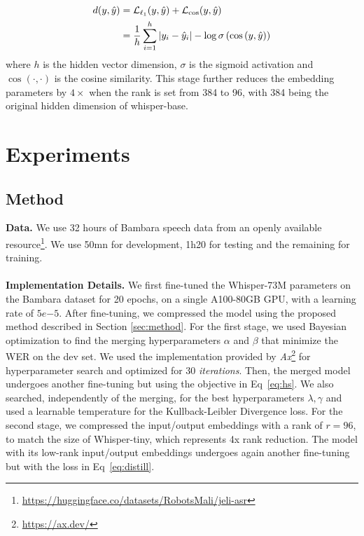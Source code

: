 \documentclass{article}
\newcommand{\myparagraph}[1]{\noindent\textbf{#1}}
\begin{document}
{\begin{align*}
    \label{eq:distance}
    d(y, \hat{y}) &= \mathcal{L}_{\ell_{1}}(y, \hat{y}) + \mathcal{L}_{\cos}(y, \hat{y}) \\
    & = \frac{1}{h} \sum_{i=1}^h |y_i - \hat{y}_i| - \log \sigma \left( \cos \left( y, \hat{y} \right) \right) \notag
\end{align*}
where $h$ is the hidden vector dimension, $\sigma$ is the
sigmoid activation and $\cos(\cdot, \cdot)$ is the cosine similarity.
This stage further reduces the embedding parameters by $4\times$ when the rank is set from 384 to 96, with 384 being the original hidden dimension of whisper-base.

\section{Experiments}
\subsection{Method}
\myparagraph{Data.} We use 32 hours of Bambara speech data from an openly available resource\footnote{\url{https://huggingface.co/datasets/RobotsMali/jeli-asr}}. We use 50mn for development, 1h20 for testing and the remaining for training.
\\
\\
\myparagraph{Implementation Details.} We first fine-tuned the Whisper-73M parameters on the Bambara dataset for 20 epochs, on a single A100-80GB GPU, with a learning rate of $5e{-5}$. After fine-tuning, we compressed the model using the proposed method described in Section \ref{sec:method}. For the first stage, we used Bayesian optimization to find the merging hyperparameters $\alpha$ and $\beta$ that minimize the WER on the dev set. We used the implementation provided by \emph{Ax}\footnote{\url{https://ax.dev/}} for hyperparameter search and optimized for 30 \textit{iterations}. Then, the merged model undergoes another fine-tuning but using the objective in Eq~\ref{eq:hs}. We also searched, independently of the merging, for the best hyperparameters $\lambda, \gamma$ and used a learnable temperature for the Kullback-Leibler Divergence loss. For the second stage, we compressed the input/output embeddings with a rank of $r=96$, to match the size of Whisper-tiny, which represents 4x rank reduction. The model with its low-rank input/output embeddings undergoes again another fine-tuning but with the loss in Eq~\ref{eq:distill}.

}
\end{document}
